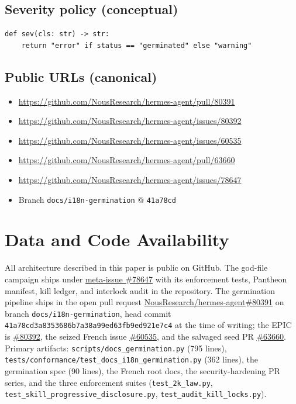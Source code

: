\documentclass[11pt]{article}
\theoremstyle{definition}
\theoremstyle{plain}
\theoremstyle{remark}
\begin{document}
\subsection{Severity policy (conceptual)}

\begin{verbatim}
def sev(cls: str) -> str:
    return "error" if status == "germinated" else "warning"
\end{verbatim}

\subsection{Public URLs (canonical)}

\begin{itemize}[leftmargin=*]
\item \url{https://github.com/NousResearch/hermes-agent/pull/80391}
\item \url{https://github.com/NousResearch/hermes-agent/issues/80392}
\item \url{https://github.com/NousResearch/hermes-agent/issues/60535}
\item \url{https://github.com/NousResearch/hermes-agent/pull/63660}
\item \url{https://github.com/NousResearch/hermes-agent/issues/78647}
\item Branch \texttt{docs/i18n-germination} @ \texttt{41a78cd}
\end{itemize}


\section*{Data and Code Availability}
All architecture described in this paper is public on GitHub. The
god-file campaign ships under
\href{https://github.com/NousResearch/hermes-agent/issues/78647}{meta-issue \#78647}
with its enforcement tests, Pantheon manifest, kill ledger, and interlock
audit in the repository. The germination pipeline ships in the open pull
request
\href{https://github.com/NousResearch/hermes-agent/pull/80391}{NousResearch/hermes-agent\#80391}
on branch \texttt{docs/i18n-germination}, head commit
\texttt{41a78cd3a8353686b7a38a99ed63fb9ed921e7c4} at the time of writing;
the EPIC is
\href{https://github.com/NousResearch/hermes-agent/issues/80392}{\#80392},
the seized French issue
\href{https://github.com/NousResearch/hermes-agent/issues/60535}{\#60535},
and the salvaged seed PR
\href{https://github.com/NousResearch/hermes-agent/pull/63660}{\#63660}.
Primary artifacts: \texttt{scripts/docs\_germination.py} (795 lines),
\texttt{tests/conformance/test\_docs\_i18n\_germination.py} (362 lines),
the germination spec (90 lines), the French root docs, the security-hardening
PR series, and the three enforcement suites
(\texttt{test\_2k\_law.py}, \texttt{test\_skill\_progressive\_disclosure.py},
\texttt{test\_audit\_kill\_locks.py}).
\end{document}
